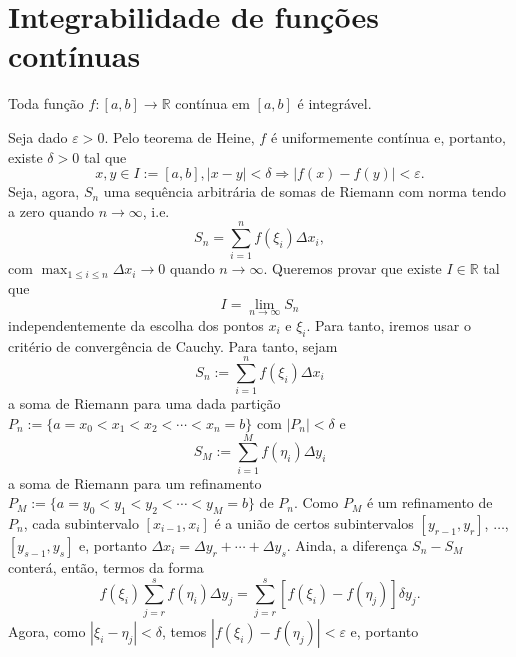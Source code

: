 \section{Integrabilidade de funções contínuas}\label{cap_integracao_sec_intfc}

\begin{teo}\label{teo:integrabilidade_de_f_continua}
  Toda função $f:[a, b]\to\mathbb{R}$ contínua em $[a, b]$ é integrável.
\end{teo}
\begin{dem}
  Seja dado $\varepsilon>0$. Pelo teorema de Heine, $f$ é uniformemente contínua e, portanto, existe $\delta>0$ tal que
  \begin{equation}
    x,y\in I:=[a, b], |x-y|<\delta \Rightarrow |f(x)-f(y)|<\varepsilon.
  \end{equation}
Seja, agora, $S_n$ uma sequência arbitrária de somas de Riemann com norma tendo a zero quando $n\to\infty$, i.e.
\begin{equation}
  S_n = \sum_{i=1}^n f(\xi_i)\Delta x_i,
\end{equation}
com $\max_{1\leq i\leq n}\Delta x_i\to 0$ quando $n\to\infty$. Queremos provar que existe $I\in\mathbb{R}$ tal que
\begin{equation}
  I = \lim_{n\to\infty} S_n
\end{equation}
independentemente da escolha dos pontos $x_i$ e $\xi_i$. Para tanto, iremos usar o critério de convergência de Cauchy. Para tanto, sejam 
\begin{equation}
  S_n := \sum_{i=1}^n f(\xi_i)\Delta x_i
\end{equation}
a soma de Riemann para uma dada partição $P_n := \{a=x_0<x_1<x_2<\cdots <x_n=b\}$ com $|P_n| < \delta$ e 
\begin{equation}
  S_M := \sum_{i=1}^M f(\eta_i)\Delta y_i
\end{equation}
a soma de Riemann para um refinamento $P_M:=\{a=y_0<y_1<y_2<\cdots <y_M=b\}$ de $P_n$. Como $P_M$ é um refinamento de $P_n$, cada subintervalo $[x_{i-1}, x_i]$ é a união de certos subintervalos $[y_{r-1}, y_{r}]$, $\ldots$, $[y_{s-1}, y_{s}]$ e, portanto $\Delta x_i = \Delta y_r + \cdots + \Delta y_s$. Ainda, a diferença $S_n - S_M$ conterá, então, termos da forma
\begin{equation}
  f(\xi_i)\sum_{j=r}^s f(\eta_i)\Delta y_j = \sum_{j=r}^s [f(\xi_i) - f(\eta_j)]\delta y_j.
\end{equation}
Agora, como $|\xi_i-\eta_j|<\delta$, temos $|f(\xi_i) - f(\eta_j)|<\varepsilon$ e, portanto

\end{dem}
